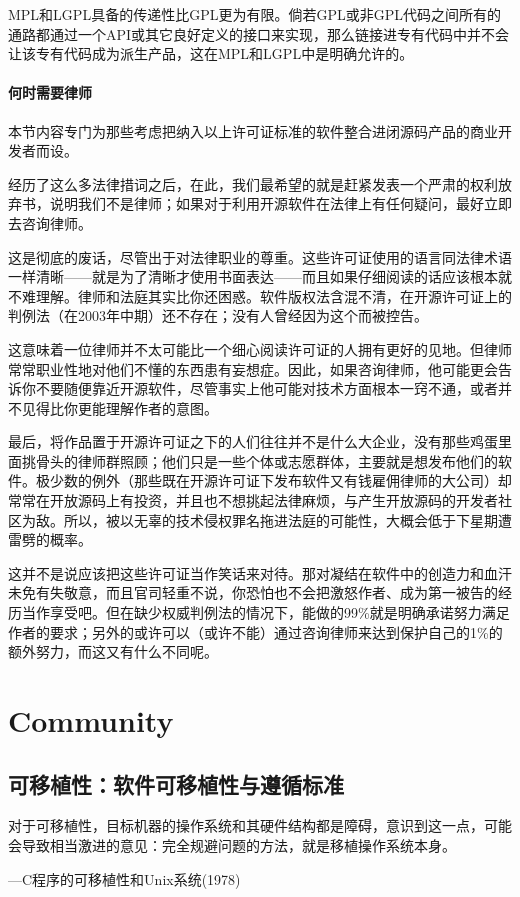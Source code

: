\documentclass[12pt,oneside]{book}
\begin{document}
MPL和LGPL具备的传递性比GPL更为有限。倘若GPL或非GPL代码之间所有的通路都通过一个API或其它良好定义的接口来实现，那么链接进专有代码中并不会让该专有代码成为派生产品，这在MPL和LGPL中是明确允许的。

\subsection{何时需要律师}
本节内容专门为那些考虑把纳入以上许可证标准的软件整合进闭源码产品的商业开发者而设。

经历了这么多法律措词之后，在此，我们最希望的就是赶紧发表一个严肃的权利放弃书，说明我们不是律师；如果对于利用开源软件在法律上有任何疑问，最好立即去咨询律师。

这是彻底的废话，尽管出于对法律职业的尊重。这些许可证使用的语言同法律术语一样清晰——就是为了清晰才使用书面表达——而且如果仔细阅读的话应该根本就不难理解。律师和法庭其实比你还困惑。软件版权法含混不清，在开源许可证上的判例法（在2003年中期）还不存在；没有人曾经因为这个而被控告。

这意味着一位律师并不太可能比一个细心阅读许可证的人拥有更好的见地。但律师常常职业性地对他们不懂的东西患有妄想症。因此，如果咨询律师，他可能更会告诉你不要随便靠近开源软件，尽管事实上他可能对技术方面根本一窍不通，或者并不见得比你更能理解作者的意图。

最后，将作品置于开源许可证之下的人们往往并不是什么大企业，没有那些鸡蛋里面挑骨头的律师群照顾；他们只是一些个体或志愿群体，主要就是想发布他们的软件。极少数的例外（那些既在开源许可证下发布软件又有钱雇佣律师的大公司）却常常在开放源码上有投资，并且也不想挑起法律麻烦，与产生开放源码的开发者社区为敌。所以，被以无辜的技术侵权罪名拖进法庭的可能性，大概会低于下星期遭雷劈的概率。

这并不是说应该把这些许可证当作笑话来对待。那对凝结在软件中的创造力和血汗未免有失敬意，而且官司轻重不说，你恐怕也不会把激怒作者、成为第一被告的经历当作享受吧。但在缺少权威判例法的情况下，能做的99\%{}就是明确承诺努力满足作者的要求；另外的或许可以（或许不能）通过咨询律师来达到保护自己的1\%{}的额外努力，而这又有什么不同呢。


\part{Community}
\chapter{可移植性：软件可移植性与遵循标准}
\begin{flushright}
对于可移植性，目标机器的操作系统和其硬件结构都是障碍，意识到这一点，可能会导致相当激进的意见：完全规避问题的方法，就是移植操作系统本身。

{\hfill —C程序的可移植性和Unix系统(1978)}
\end{flushright}
\end{document}
